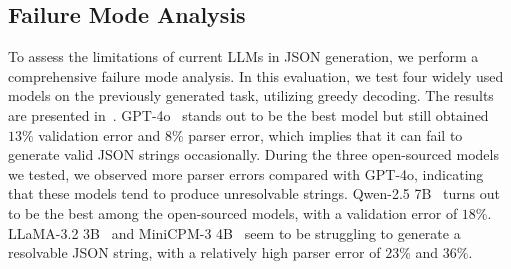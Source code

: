 




\subsection{Failure Mode Analysis}
To assess the limitations of current LLMs in JSON generation, we perform a comprehensive failure mode analysis.
In this evaluation, we test four widely used models on the previously generated task, utilizing greedy decoding. 
The results are presented in~.
GPT-4o~\citep{openai2023gpt4} stands out to be the best model but still obtained $13\%$ validation error and $8\%$ parser error, which implies that it can fail to generate valid JSON strings occasionally.
During the three open-sourced models we tested, we observed more parser errors compared with GPT-4o, indicating that these models tend to produce unresolvable strings.
Qwen-2.5 7B~\citep{qwen2} turns out to be the best among the open-sourced models, with a validation error of $18\%$.
LLaMA-3.2 3B~\citep{2024llama3} and MiniCPM-3 4B~\citep{hu2024minicpm} seem to be struggling to generate a resolvable JSON string, with a relatively high parser error of $23\%$ and $36\%$.

